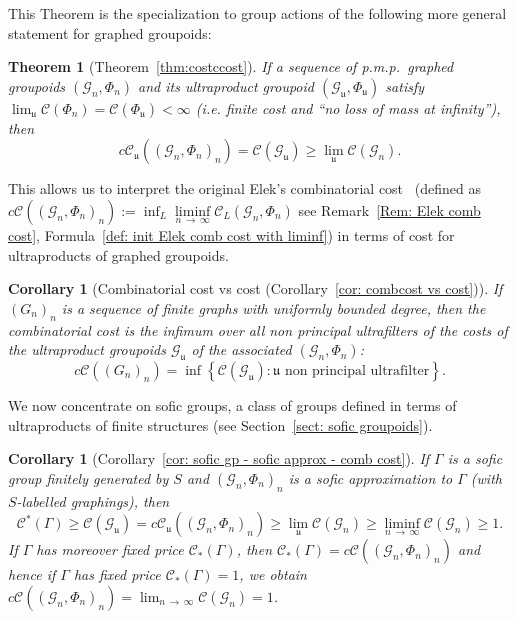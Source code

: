 \documentclass[10pt]{amsart}
\newtheorem{theo}[cdrthm]{Theorem}
\newtheorem{coro}[cdrthm]{Corollary}
\theoremstyle{definition}
\newcommand{\cost}{\mathcal{C}}
\newcommand{\ccost}{c\mathcal{C}}
\newcommand{\cg}{\mathcal{G}}
\newcommand{\vraicost}{\mathscr{C}}
\newcommand{\ul}{\mathfrak{u}}
\newcommand{\pmp}{p.m.p.\ }
\begin{document}
This Theorem is the specialization to group actions of the following more general statement for graphed groupoids:
\begin{theo}[{Theorem~\ref{thm:costccost}}]
If a sequence of \pmp graphed groupoids $(\cg_n,\Phi_n)$ and its ultraproduct groupoid $(\cg_\ul,\Phi_\ul)$ satisfy $\lim_\ul \cost(\Phi_n) = \cost(\Phi_\ul) <\infty$ (i.e. finite cost and ``no loss of mass at infinity''), then
\[
\ccost_\ul\left(\left(\cg_n,\Phi_n\right)_n\right)=\cost(\cg_\ul)\geq\lim_{\ul}\cost(\cg_{n}).
\]
\end{theo}


This allows us to interpret the original Elek's combinatorial cost~\cite{Elek-combinatorial-cost-2007} (defined as $\ccost((\cg_n,\Phi_n)_n):=\inf_L\liminf\limits_{n\,\to\,\infty}\cost_L(\cg_n,\Phi_n)$ see Remark~\ref{Rem: Elek comb cost}, Formula~\eqref{def: init Elek comb cost with liminf}) in terms of cost for ultraproducts of graphed groupoids.
\begin{coro}[Combinatorial cost vs cost (Corollary~\ref{cor: combcost vs cost})]
If $(G_n)_n$ is a sequence of finite graphs with uniformly bounded degree, then the combinatorial cost is the infimum over all non principal ultrafilters of the costs of the ultraproduct groupoids $\cg_\ul$ of the associated $(\cg_n,\Phi_n)$:
\begin{equation*}
\ccost\left((G_n)_n\right) = \inf \left\{\cost(\cg_{\ul}) : \ul \text{ non principal ultrafilter} \right\}.
\end{equation*}
\end{coro}


We now concentrate on sofic groups, a class of groups defined in terms of ultraproducts of finite structures (see Section~\ref{sect: sofic groupoids}).

\begin{coro}[Corollary~\ref{cor: sofic gp - sofic approx - comb cost}]
If $\Gamma$ is a sofic group finitely generated by $S$ and $(\cg_n, \Phi_n)_n$ is a sofic approximation to $\Gamma$ (with $S$-labelled graphings), then
\begin{equation}
\vraicost^*(\Gamma)\geq \cost(\cg_\ul)=\ccost_\ul\left((\cg_n,\Phi_n)_n\right) \geq \lim_{\ul}\cost(\cg_{n})\geq \liminf_{n\,\to\,\infty}\cost(\cg_{n}) \geq 1.
\end{equation}
If $\Gamma$ has moreover fixed price $\vraicost_*(\Gamma)$, then $\vraicost_*(\Gamma)=\ccost((\cg_n,\Phi_n)_n) $ and hence if $\Gamma$ has fixed price $\vraicost_*(\Gamma)=1$, we obtain $\ccost((\cg_n,\Phi_n)_n) = \lim_{n\,\to\,\infty}\cost(\cg_{n}) = 1$.
\end{coro}
\end{document}
